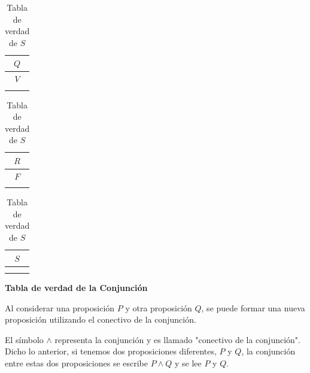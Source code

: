 \documentclass[letterpaper, twoside]{article}
\begin{document}
\begin{table}[htbp]

  \centering
    \begin{minipage}[t]{0.31\textwidth}
      \centering
      \begin{tabular}{|c|}
        \hline
        $Q$ \\ \hline
        $V$ \\ \hline
            \\ 
        \hline
      \end{tabular}
      \caption*{Tabla de verdad de $Q$}
    \end{minipage}%
    \hfill
    \begin{minipage}[t]{0.31\textwidth}
      \centering
      \begin{tabular}{|c|}
        \hline
        $R$ \\ \hline
        $F$ \\ \hline
            \\ 
        \hline
      \end{tabular}
      \caption*{Tabla de verdad de $R$}
    \end{minipage}%
    \hfill
    \begin{minipage}[t]{0.31\textwidth}
      \centering
      \begin{tabular}{|c|}
        \hline
        $S$ \\ \hline
            \\ \hline
            \\ 
        \hline
      \end{tabular}
      \caption*{Tabla de verdad de $S$}
    \end{minipage}

\end{table}

\vspace{1cm}

\textbf{Tabla de verdad de la Conjunción}\par

\vspace{.5cm}

Al considerar una proposición $P$ y otra proposición $Q$, se puede formar una nueva proposición utilizando el conectivo de la conjunción.\par

\vspace{.5cm}

El símbolo $\boldsymbol{\land}$ representa la conjunción y es llamado "conectivo de la conjunción". Dicho lo anterior, si tenemos dos proposiciones diferentes, $P$ y $Q$, la conjunción entre estas dos proposiciones se escribe $P\land Q$ y se lee $P$ y $Q$.\par
\end{document}

